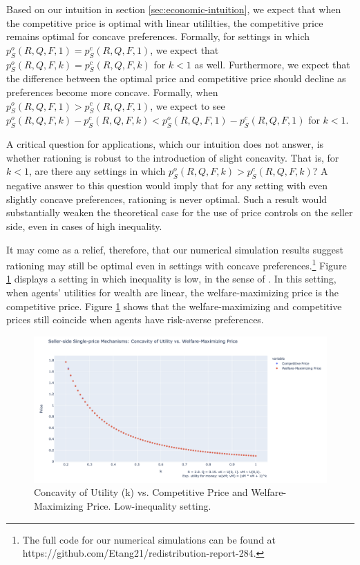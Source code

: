 \documentclass[AER]{AEA}
\begin{document}
Based on our intuition in section \ref{sec:economic-intuition}, we expect that when the competitive price is optimal with linear utililties, the competitive price remains optimal for concave preferences. Formally, for settings in which $p_S^o(R, Q, F, 1) = p_S^c(R, Q, F, 1)$, we expect that $p_S^o(R, Q, F, k) = p_S^c(R, Q, F, k)$ for $k < 1$ as well. Furthermore, we expect that the difference between the optimal price and competitive price should decline as preferences become more concave. Formally, when $p_S^o(R, Q, F, 1) > p_S^c(R, Q, F, 1)$, we expect to see $p_S^o(R, Q, F, k) - p_S^c(R, Q, F, k) < p_S^o(R, Q, F, 1) - p_S^c(R, Q, F, 1)$ for $k < 1$. 

A critical question for applications, which our intuition does not answer, is whether rationing is robust to the introduction of slight concavity. That is, for $k < 1$, are there any settings in which $p_S^o(R, Q, F, k) > p_S^c(R, Q, F, k)$? A negative answer to this question would imply that for any setting with even slightly concave preferences, rationing is never optimal. Such a result would substantially weaken the theoretical case for the use of price controls on the seller side, even in cases of high inequality.

It may come as a relief, therefore, that our numerical simulation results suggest rationing may still be optimal even in settings with concave preferences.\footnote{The full code for our numerical simulations can be found at https://github.com/Etang21/redistribution-report-284.} Figure \ref{k-vs-prices-inequality-low} displays a setting in which inequality is low, in the sense of \cite{dworczak-2020}. In this setting, when agents' utilities for wealth are linear, the welfare-maximizing price is the competitive price. Figure \ref{k-vs-prices-inequality-low} shows that the welfare-maximizing and competitive prices still coincide when agents have risk-averse preferences.



\begin{figure}
    \label{k-vs-prices-inequality-low}
    \includegraphics[width=\textwidth]{figures/k-vs-prices-inequality-low.png}
    \caption{Concavity of Utility (k) vs. Competitive Price and Welfare-Maximizing Price. Low-inequality setting.}
\end{figure}
\end{document}
